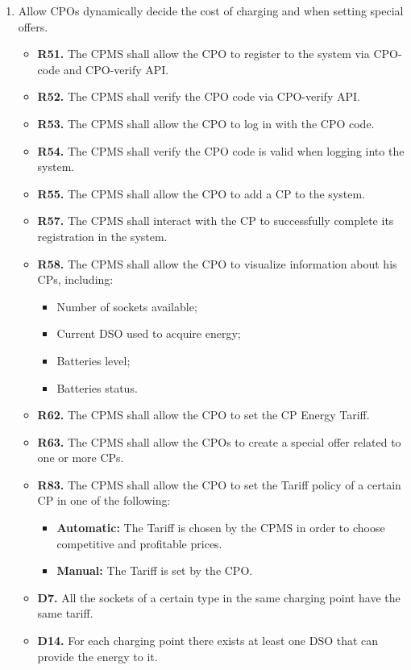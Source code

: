 \documentclass{Configuration_Files/PoliMi3i_thesis}
\begin{document}
\begin{enumerate}[label=\textbf{G\arabic*}]
    \item Allow CPOs dynamically decide the cost of charging and when setting special offers.
        \begin{itemize}
            \item \textbf{R51.} The CPMS shall allow the CPO to register to the system via CPO-code and CPO-verify API.
            \item \textbf{R52.} The CPMS shall verify the CPO code via CPO-verify API.
            \item \textbf{R53.} The CPMS shall allow the CPO to log in with the CPO code.
            \item \textbf{R54.} The CPMS shall verify the CPO code is valid when logging into the system.
            \item \textbf{R55.} The CPMS shall allow the CPO to add a CP to the system.
            \item \textbf{R57.} The CPMS shall interact with the CP to successfully complete its registration in the system.
            \item \textbf{R58.} The CPMS shall allow the CPO to visualize information about his CPs, including:
                \begin{itemize}
                    \item Number of sockets available;
                    \item Current DSO used to acquire energy;
                    \item Batteries level;
                    \item Batteries status.
                \end{itemize}
            \item \textbf{R62.} The CPMS shall allow the CPO to set the CP Energy Tariff.
            \item \textbf{R63.} The CPMS shall allow the CPOs to create a special offer related to one or more CPs.
            \item \textbf{R83.} The CPMS shall allow the CPO to set the Tariff policy of a certain CP in one of the following:
                \begin{itemize}
                    \item \textbf{Automatic:} The Tariff is chosen by the CPMS in order to choose competitive and profitable prices.   
                    \item\textbf{Manual:} The Tariff is set by the CPO. 
                \end{itemize}
            \item \textbf{D7.} All the sockets of a certain type in the same charging point have the same tariff.
            \item \textbf{D14.} For each charging point there exists at least one DSO that can provide the energy to it.
        \end{itemize}


\end{enumerate}
\end{document}
